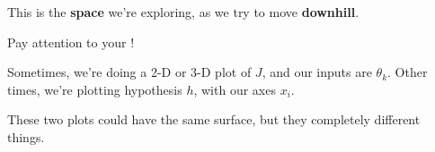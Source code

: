     This is the \textbf{space} we're exploring, as we try to move \textbf{downhill}. \\
    
    \begin{clarification}
        Pay attention to your ! 
        
        Sometimes, we're doing a 2-D or 3-D plot of $J$, and our inputs are $\theta_k$. Other times, we're plotting hypothesis $h$, with our axes $x_i$.
        
        These two plots could have the same surface, but they  completely different things.
    \end{clarification}


        
        
